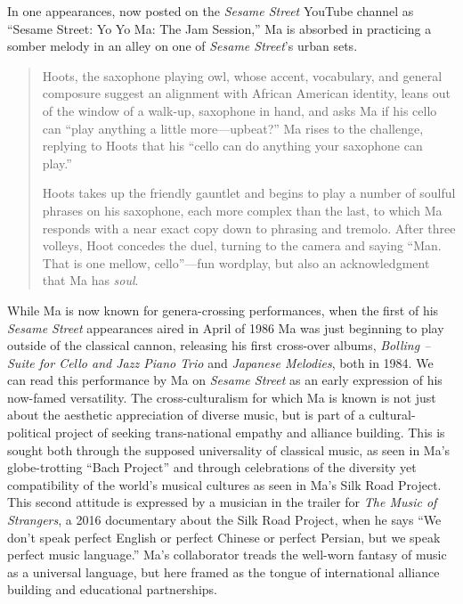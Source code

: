 \documentclass[12pt,letterpaper]{article}
\newcommand{\ses}{\textit{Sesame Street }}
\begin{document}
	In one appearances, now posted on the 
	\ses YouTube channel as ``Sesame Street: Yo Yo Ma: The Jam Session,'' 
	Ma is absorbed in practicing a somber melody in an alley on one of 
	\textit{Sesame Street}'s urban sets.

	\begin{quote}	

	\ttfamily

	Hoots, the saxophone playing owl, whose accent, vocabulary, and general
	composure suggest an alignment with African American identity, leans out
	of the window of a walk-up, saxophone in hand, and asks Ma if his cello
	can ``play anything a little more---upbeat?'' Ma rises to the challenge,
	replying to Hoots that his ``cello can do anything your saxophone can 
	play.''

	Hoots takes up the friendly gauntlet and begins to play a number of 
	soulful phrases on his saxophone, each more complex than the last, to 
	which Ma responds with a near exact copy down to phrasing and tremolo. 
	After three volleys, Hoot concedes the duel, turning to the camera and 
	saying ``Man. That is one mellow, cello''---fun wordplay, but also an 
	acknowledgment that Ma has \textit{soul}.

	\end{quote}

	While Ma is now known for genera-crossing performances, when the first
	of his \textit{Sesame Street} appearances aired in April of
	1986\autocite{2210} Ma was just beginning to play outside of the 
	classical cannon, releasing his first cross-over albums, 
	\textit{Bolling – Suite for Cello and Jazz Piano Trio} and 
	\textit{Japanese Melodies}, both in 1984.\autocite{MaSite} We can read 
	this performance by Ma on \textit{Sesame Street} as an early expression
	of his now-famed versatility. The cross-culturalism for which Ma is 
	known is not just about the aesthetic appreciation of diverse music, but
	is part of a cultural-political project of seeking trans-national 
	empathy and alliance building. This is sought both through the supposed 
	universality of classical music, as seen in Ma's globe-trotting 
	``Bach Project''\autocite{BachProject} and through celebrations of the 
	diversity yet compatibility of the world's musical cultures as seen in 
	Ma's Silk Road Project. This second attitude is expressed by a musician 
	in the trailer for \textit{The Music of Strangers}, a 2016 documentary 
	about the Silk Road Project, when he says ``We don't speak perfect 
	English or perfect Chinese or perfect Persian, but we speak perfect 
	music language.''\autocite{Strangers} Ma's collaborator treads the
	well-worn fantasy of music as a universal language, but here framed as
	the tongue of international alliance building and educational
	partnerships.
\end{document}
